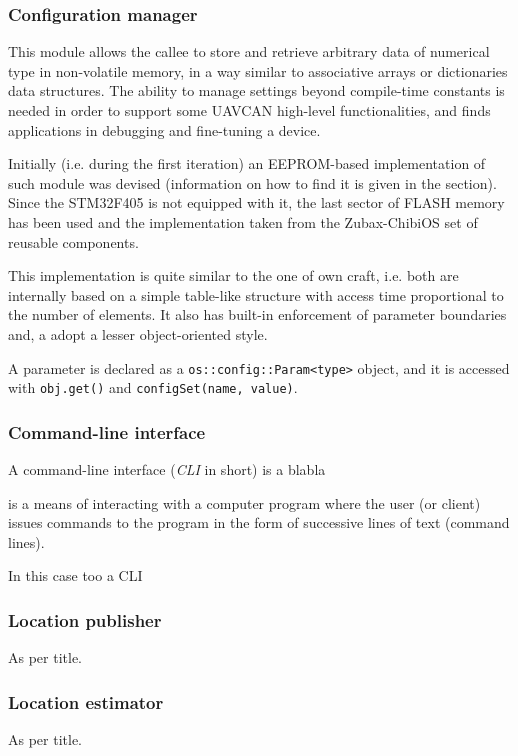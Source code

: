 \subsubsection{Configuration manager}
This module allows the callee to store and retrieve arbitrary data of numerical type in non-volatile memory, in a way similar to associative arrays or dictionaries data structures.
The ability to manage settings beyond compile-time constants is needed in order to support some UAVCAN high-level functionalities, and finds applications in debugging and fine-tuning a device.

Initially (i.e. during the first iteration) an EEPROM-based implementation of such module was devised (information on how to find it is given in the  section).
Since the STM32F405 is not equipped with it, the last sector of FLASH memory has been used and the implementation taken from the Zubax-ChibiOS set of reusable components.

This implementation is quite similar to the one of own craft, i.e. both are internally based on a simple table-like structure with access time proportional to the number of elements.
It also has built-in enforcement of parameter boundaries and, a adopt a lesser object-oriented style.

A parameter is declared as a \texttt{os::config::Param<type>} object, and it is accessed with \texttt{obj.get()} and \texttt{configSet(name, value)}.


\subsubsection{Command-line interface}
A command-line interface (\emph{CLI} in short) is a blabla

is a means of interacting with a computer program where the user (or client) issues commands to the program in the form of successive lines of text (command lines).

In this case too a CLI


\subsubsection{Location publisher}
As per title.

\subsubsection{Location estimator}
As per title.

